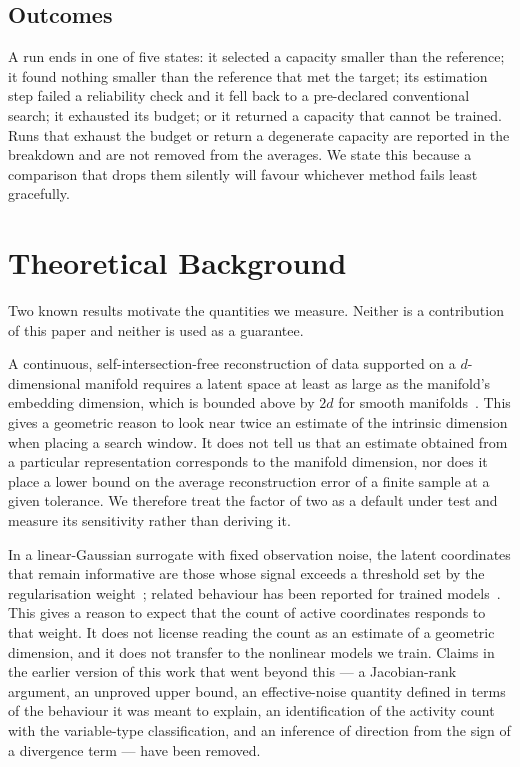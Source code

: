 \documentclass[make,article,submit,pdftex,moreauthors]{Definitions/mdpi}
\begin{document}
\subsection{Outcomes}\label{sec:framework_outcomes}

A run ends in one of five states: it selected a capacity smaller than the
reference; it found nothing smaller than the reference that met the
target; its estimation step failed a reliability check and it fell back to
a pre-declared conventional search; it exhausted its budget; or it
returned a capacity that cannot be trained. Runs that exhaust the budget
or return a degenerate capacity are reported in the breakdown and are not
removed from the averages. We state this because a comparison that drops
them silently will favour whichever method fails least gracefully.

\section{Theoretical Background}\label{sec:theory}

Two known results motivate the quantities we measure. Neither is a
contribution of this paper and neither is used as a guarantee.

A continuous, self-intersection-free reconstruction of data supported on a
$d$-dimensional manifold requires a latent space at least as large as the
manifold's embedding dimension, which is bounded above by $2d$ for smooth manifolds~\cite{hatcher2002algebraic}. This gives a geometric reason to look near twice an estimate of
the intrinsic dimension when placing a search window. It does not tell us
that an estimate obtained from a particular representation corresponds to
the manifold dimension, nor does it place a lower bound on the average
reconstruction error of a finite sample at a given tolerance. We therefore
treat the factor of two as a default under test and measure its
sensitivity rather than deriving it.

In a linear-Gaussian surrogate with fixed observation noise, the latent
coordinates that remain informative are those whose signal exceeds a
threshold set by the regularisation weight~\cite{cover2006elements};
related behaviour has been reported for trained
models~\cite{rolinek2019pca}. This gives a reason to expect
that the count of active coordinates responds to that weight. It does not
license reading the count as an estimate of a geometric dimension, and it
does not transfer to the nonlinear models we train. Claims in the earlier
version of this work that went beyond this --- a Jacobian-rank argument, an
unproved upper bound, an effective-noise quantity defined in terms of the
behaviour it was meant to explain, an identification of the activity count
with the variable-type classification, and an inference of direction from
the sign of a divergence term --- have been removed.
\end{document}
